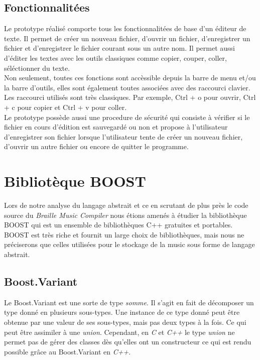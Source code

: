 \subsection*{Fonctionnalitées}
Le prototype réalisé comporte tous les fonctionnalitées de base d'un
éditeur de texte. Il permet de créer un nouveau fichier, d'ouvrir un
fichier, d'enregistrer un fichier et d'enregistrer le fichier courant
sous un autre nom. Il permet aussi d'éditer les textes avec les outils
classiques comme copier, couper, coller, séléctionner du texte.
\\ Non seulement, toutes ces fonctions sont accèssible depuis la barre
de menu et/ou la barre d'outils, elles sont également toutes associées
avec des raccourci clavier. Les raccourci utilisés sont très
classiques. Par exemple, Ctrl + o pour ouvrir, Ctrl + c pour copier et
Ctrl + v pour coller.
\\ Le prototype possède aussi une procedure de
sécurité qui consiste à vérifier si le fichier en cours d'édition est
sauvegardé ou non et propose à l'utilisateur d'enregistrer son
fichier lorsque l'utilisateur tente de créer un nouveau fichier,
d'ouvrir un autre fichier ou encore de quitter le programme.




\section{Bibliotèque BOOST}

Lors de notre analyse du langage abstrait et ce en scrutant de plus près le code source du \textit{Braille Music Compiler} nous étions amenés à étudier la bibliothèque BOOST  qui est un ensemble de bibliothèques C++ gratuites et portables. BOOST est très riche et fournit un large choix de bibliothèques, mais nous ne préciserons que celles utilisées pour le stockage de la music sous forme de langage abstrait.


\subsection*{Boost.Variant}

Le Boost.Variant est une sorte de type \textit{somme}. Il s'agit en fait de décomposer un type donné en plusieurs sous-types. Une instance de ce type donné peut être obtenue par une valeur de ses sous-types, mais pas deux types à la fois. Ce qui peut être assimiler à une \textit{union}. Cependant, en \textit{C} et \textit{C++} le type \textit{union} ne permet pas de gérer des classes dès qu'elles ont un constructeur ce qui est rendu possible grâce au Boost.Variant en \textit{C++}.

